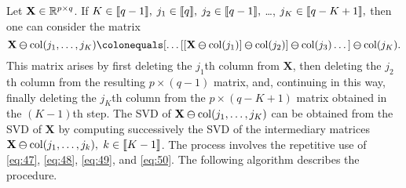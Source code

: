 \documentclass[11pt,a4paper]{article}
\DeclarePairedDelimiter\Brackets{\llbracket}{\rrbracket}
\theoremstyle{break}
\numberwithin{dummy}{section}
\theoremstyle{plain}
\theoremstyle{plain}
\theoremstyle{plain}
\theoremstyle{plain}
\theoremstyle{plain}
\theoremstyle{MyNonumberplain}
\newcommand{\0}{\M{0}}
\newcommand{\M}[1]{\mathbf{#1}}
\newcommand{\R}{\mathbb{R}}
\newcommand{\Mat}[2]{%
  \ifthenelse{\equal{#2}{1}}
  {\R^{#1}}
  {\R^{#1 \times #2}}
}
\newcommand{\delcol}[2]{\M{#1} \varominus {\mathrm{col}}({#2})}
\begin{document}
Let $\M{X} \in \Mat{p}{q}$. If
\begin{math}
  K \in \Brackets{q-1},
\end{math}
\begin{math}
  j_1 \in \Brackets{q},
\end{math}
\begin{math}
  j_2 \in \Brackets{q - 1},
\end{math}
\dots,
\begin{math}
  j_K \in \Brackets{q - K + 1},
\end{math}
then one can consider the matrix
\begin{displaymath}
  \delcol{X}{j_1, \dots, j_K}
  \colonequals
  [ \dots [[\delcol{X}{j_1}] \varominus \mathrm{col}(j_2)]
   \varominus \mathrm{col}(j_3)
  \dots ]
  \varominus \mathrm{col}(j_K).
\end{displaymath}
This matrix arises by first deleting the $j_1$th column from $\M{X}$, then deleting the $j_2$th column from the resulting $p \times (q-1)$ matrix, and, continuing in this way, finally deleting the $j_K$th column from the $p \times (q - K + 1)$ matrix obtained in the $(K-1)$th step. The SVD of
\begin{math}
  \delcol{X}{j_1, \dots, j_K}
\end{math}
can be obtained from the SVD of $\M{X}$ by computing successively the SVD of the intermediary matrices
\begin{math}
  \delcol{X}{j_1, \dots, j_k},
\end{math}
$k \in \Brackets{K-1}$.  The process involves the repetitive use of \eqref{eq:47}, \eqref{eq:48}, \eqref{eq:49}, and \eqref{eq:50}.  The following algorithm describes the procedure.
\end{document}
